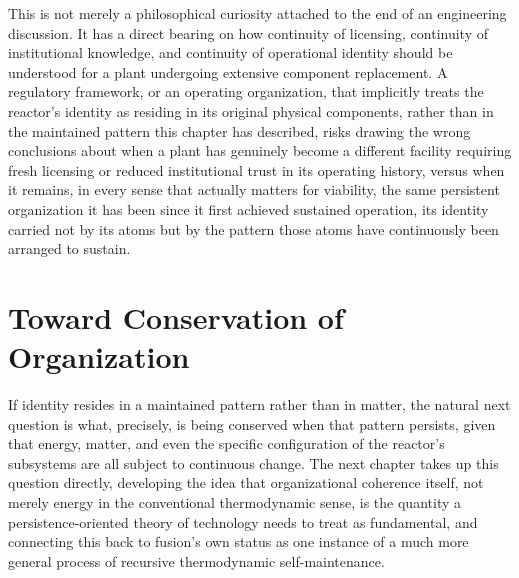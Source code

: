 This is not merely a philosophical curiosity attached to the end of an engineering discussion. It has a direct bearing on how continuity of licensing, continuity of institutional knowledge, and continuity of operational identity should be understood for a plant undergoing extensive component replacement. A regulatory framework, or an operating organization, that implicitly treats the reactor's identity as residing in its original physical components, rather than in the maintained pattern this chapter has described, risks drawing the wrong conclusions about when a plant has genuinely become a different facility requiring fresh licensing or reduced institutional trust in its operating history, versus when it remains, in every sense that actually matters for viability, the same persistent organization it has been since it first achieved sustained operation, its identity carried not by its atoms but by the pattern those atoms have continuously been arranged to sustain.

\section{Toward Conservation of Organization}

If identity resides in a maintained pattern rather than in matter, the natural next question is what, precisely, is being conserved when that pattern persists, given that energy, matter, and even the specific configuration of the reactor's subsystems are all subject to continuous change. The next chapter takes up this question directly, developing the idea that organizational coherence itself, not merely energy in the conventional thermodynamic sense, is the quantity a persistence-oriented theory of technology needs to treat as fundamental, and connecting this back to fusion's own status as one instance of a much more general process of recursive thermodynamic self-maintenance.
